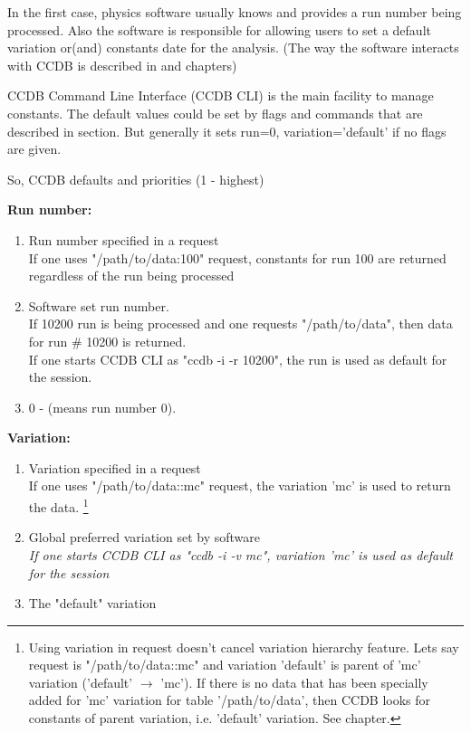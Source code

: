 \documentclass{article}
\begin{document}
In the first case, physics software usually knows and provides a run number being processed. Also the software is responsible for allowing users to set a default variation or(and) constants date for the analysis. (The way the software interacts with CCDB is described in  and  chapters)

CCDB Command Line Interface (CCDB CLI) is the main facility to manage constants. The default values could be set by flags and commands that are described in  section. But generally it sets run=0, variation='default' if no flags are given. 

So, CCDB defaults and priorities (1 - highest)

\textbf{Run number:}
\begin{enumerate}

\item Run number specified in a request\\
If one uses "/path/to/data:100" request, constants for run 100 are returned regardless of the run being processed

\item Software set run number.\\
If 10200 run is being processed and one requests "/path/to/data", then data for run \# 10200 is returned.\\
If one starts CCDB CLI as "ccdb -i -r 10200", the run is used as default for the session.

\item  0 - (means run number 0).
\end{enumerate}
\vspace{1 em}

\textbf{Variation:}
\begin{enumerate}

\item Variation specified in a request\\
If one uses "/path/to/data::mc" request, the variation 'mc' is used to return the data. 
\footnote{ Using variation in request doesn't cancel variation hierarchy feature. Lets say request is "/path/to/data::mc" and variation 'default' is parent of 'mc' variation ('default' $\rightarrow$ 'mc'). If there is no data that has been specially added for 'mc' variation for table '/path/to/data', then CCDB looks for constants of parent variation, i.e. 'default' variation. See  chapter.}

\item Global preferred variation set by software\\
\textit{If one starts CCDB CLI as "ccdb -i -v mc", variation 'mc' is used as default for the session}

\item The "default" variation
\end{enumerate}
\end{document}
